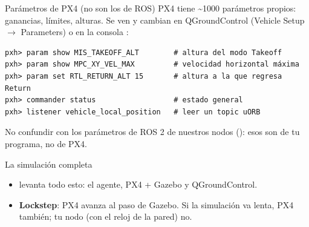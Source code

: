 \begin{frame}[fragile]{Parámetros de PX4 (no son los de ROS)}
  \small PX4 tiene \textasciitilde1000 parámetros propios: ganancias, límites, alturas. Se ven y cambian en
  QGroundControl (Vehicle Setup $\rightarrow$ Parameters) o en la consola :
  \begin{lstlisting}[style=bash,caption={En la terminal donde corre PX4 SITL}]
pxh> param show MIS_TAKEOFF_ALT        # altura del modo Takeoff
pxh> param show MPC_XY_VEL_MAX         # velocidad horizontal máxima
pxh> param set RTL_RETURN_ALT 15       # altura a la que regresa Return
pxh> commander status                  # estado general
pxh> listener vehicle_local_position   # leer un topic uORB
  \end{lstlisting}
  \begin{ojo}
    \small No confundir con los parámetros de ROS 2 de nuestros nodos ():
    esos son de tu programa, no de PX4.
  \end{ojo}
\end{frame}

\begin{frame}{La simulación completa}
  \centering
  \vspace{0.6em}
  \begin{itemize}\small
    \item {} levanta todo esto: el agente, PX4 + Gazebo y QGroundControl.
    \item \textbf{Lockstep}: PX4 avanza al paso de Gazebo. Si la simulación va lenta, PX4 también; tu
      nodo (con el reloj de la pared) no.
  \end{itemize}
\end{frame}
